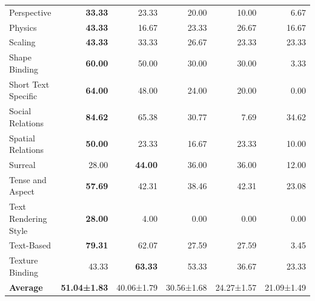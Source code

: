 \documentclass[11pt]{article}
\begin{document}
\begin{table}[htbp]
{\begin{tabular}{|l|r|r|r|r|r|}
    Perspective                & \textbf{33.33} & 23.33 & 20.00 & 10.00 & 6.67 \\
    Physics                    & \textbf{43.33} & 16.67 & 23.33 & 26.67 & 16.67 \\
    Scaling                    & \textbf{43.33} & 33.33 & 26.67 & 23.33 & 23.33 \\
    Shape Binding              & \textbf{60.00} & 50.00 & 30.00 & 30.00 & 3.33 \\
    Short Text Specific        & \textbf{64.00} & 48.00 & 24.00 & 20.00 & 0.00 \\
    Social Relations           & \textbf{84.62} & 65.38 & 30.77 & 7.69 & 34.62 \\
    Spatial Relations          & \textbf{50.00} & 23.33 & 16.67 & 23.33 & 10.00 \\
    Surreal                    & 28.00 & \textbf{44.00} & 36.00 & 36.00 & 12.00 \\
    Tense and Aspect           & \textbf{57.69} & 42.31 & 38.46 & 42.31 & 23.08 \\
    Text Rendering Style       & \textbf{28.00} & 4.00 & 0.00 & 0.00 & 0.00 \\
    Text-Based                 & \textbf{79.31} & 62.07 & 27.59 & 27.59 & 3.45 \\
    Texture Binding            & 43.33 & \textbf{63.33} & 53.33 & 36.67 & 23.33 \\
    \midrule
    \textbf{Average}           & \textbf{51.04±1.83} & 40.06±1.79 & 30.56±1.68 & 24.27±1.57 & 21.09±1.49 \\

    \bottomrule
\end{tabular}
}
\end{table}
\end{document}

